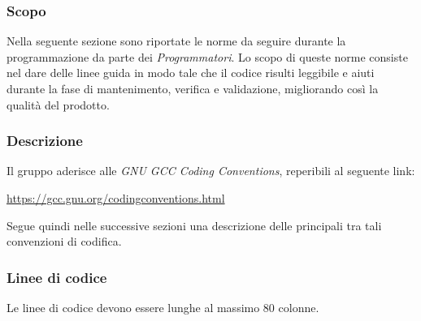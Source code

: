 \documentclass[../NomeDocumento.tex]{subfiles}
\begin{document}
	\subsubsection{Scopo}
	
	Nella seguente sezione sono riportate le norme da seguire durante la programmazione da parte dei \textit{Programmatori}. Lo scopo di queste norme consiste nel dare delle linee guida in modo tale che il codice risulti leggibile e aiuti durante la fase di mantenimento, verifica e validazione, migliorando così la qualità del prodotto.

	\subsubsection{Descrizione}
	
	Il gruppo aderisce alle \textit{GNU GCC Coding Conventions}, reperibili al seguente link:
	
	\begin{center}
		\url{https://gcc.gnu.org/codingconventions.html}
	\end{center}

	\noindent Segue quindi nelle successive sezioni una descrizione delle principali tra tali convenzioni di codifica.   
	
	\subsubsection{Linee di codice}
		Le linee di codice devono essere lunghe al massimo 80 colonne.
		
\end{document}
